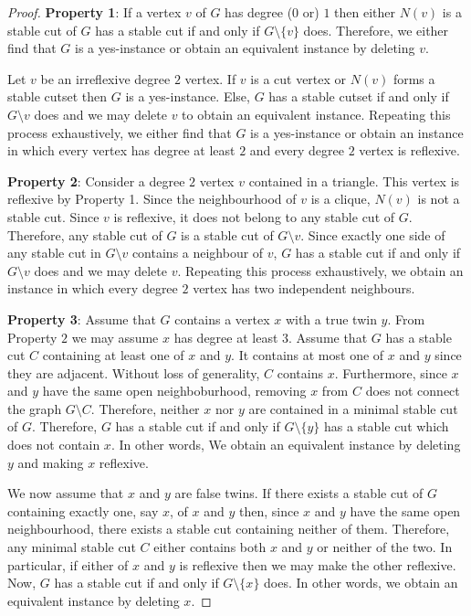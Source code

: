 \documentclass[10pt,a4paper]{amsart}
\begin{document}
\begin{proof}
{\textbf {Property 1}}:
If a vertex $v$ of $G$ has degree ($0$ or) $1$ then either $N(v)$ is a stable cut of $G$ has a stable cut if and only if $G \setminus \{v\}$ does. Therefore, we either find that $G$ is a yes-instance or obtain an equivalent instance by deleting $v$.

Let $v$ be an irreflexive degree $2$ vertex. If $v$ is a cut vertex or $N(v)$ forms a stable cutset then $G$ is a yes-instance. Else, $G$ has a stable cutset if and only if $G \setminus {v}$ does and we may delete $v$ to obtain an equivalent instance. Repeating this process exhaustively, we either find that $G$ is a yes-instance or obtain an instance in which every vertex has degree at least $2$ and every degree $2$ vertex is reflexive.

\textbf{Property 2}:
Consider a degree $2$ vertex $v$ contained in a triangle. This vertex is reflexive by Property 1. Since the neighbourhood of $v$ is a clique, $N(v)$ is not a stable cut. Since $v$ is reflexive, it does not belong to any stable cut of $G$. Therefore, any stable cut of $G$ is a stable cut of $G \setminus v$. Since exactly one side of any stable cut in $G \setminus v$ contains a neighbour of $v$, $G$ has a stable cut if and only if $G \setminus v$ does and we may delete $v$. Repeating this process exhaustively, we obtain an instance in which every degree $2$ vertex has two independent neighbours.

\textbf{Property 3}:
Assume that $G$ contains a vertex $x$ with a true twin $y$. From Property $2$ we may assume $x$ has degree at least $3$. Assume that $G$ has a stable cut $C$ containing at least one of $x$ and $y$. It contains at most one of $x$ and $y$ since they are adjacent. Without loss of generality, $C$ contains $x$. Furthermore, since $x$ and $y$ have the same open neighboburhood, removing $x$ from $C$ does not connect the graph $G \setminus {C}$. Therefore, neither $x$ nor $y$ are contained in a minimal stable cut of $G$. Therefore, $G$ has a stable cut if and only if $G \setminus \{y \}$ has a stable cut which does not contain $x$. In other words, We obtain an equivalent instance by deleting $y$ and making $x$ reflexive.

We now assume that $x$ and $y$ are false twins. If there exists a stable cut of $G$ containing exactly one, say $x$, of $x$ and $y$ then, since $x$ and $y$ have the same open neighbourhood, there exists a stable cut containing neither of them. Therefore, any minimal stable cut $C$ either contains both $x$ and $y$ or neither of the two. In particular, if either of $x$ and $y$ is reflexive then we may make the other reflexive. Now, $G$ has a stable cut if and only if $G \setminus \{x \}$ does. In other words, we obtain an equivalent instance by deleting $x$.


\end{proof}
\end{document}
